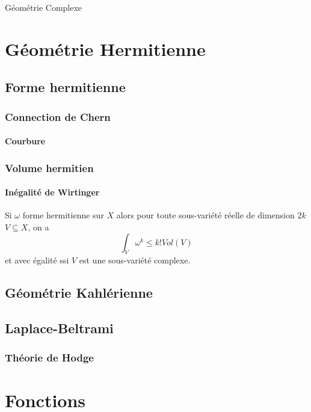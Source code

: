 Géométrie
Complexe

\chapter{Géométrie
Hermitienne}

\section{Forme hermitienne}

\subsection{Connection de Chern}

\subsubsection{Courbure}

\subsection{Volume hermitien}

\subsubsection{Inégalité de Wirtinger}
Si $\omega$ forme hermitienne sur $X$
alors
pour toute sous-variété réelle de dimension $2k$ $V \subseteq X$, on a
\[
\int_{V} \omega^k \leq  k! Vol(V)
\]
et avec égalité ssi $V$ est une sous-variété complexe.

\cite{Huybrechts}

\section{Géométrie Kahlérienne}

\section{Laplace-Beltrami}

\subsection{Théorie de Hodge}

\chapter{Fonctions}

